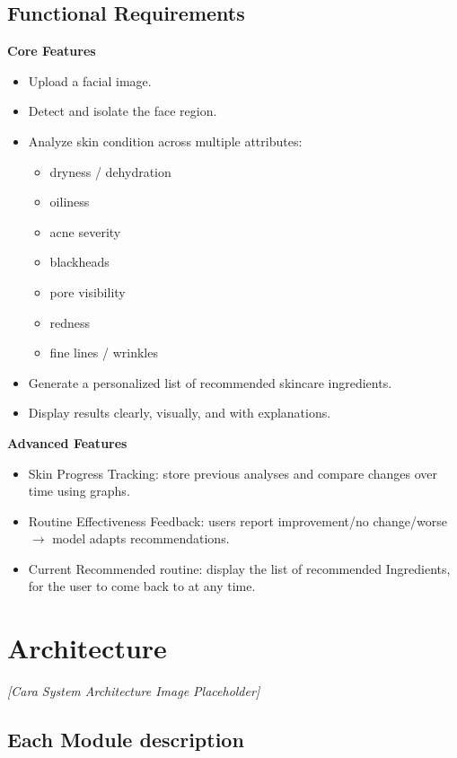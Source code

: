 \documentclass[12pt,a4paper]{article}
\begin{document}
\subsection{Functional Requirements}
\textbf{Core Features}
\begin{itemize}
    \item Upload a facial image.
    \item Detect and isolate the face region.
    \item Analyze skin condition across multiple attributes:
    \begin{itemize}
        \item dryness / dehydration
        \item oiliness
        \item acne severity
        \item blackheads
        \item pore visibility
        \item redness
        \item fine lines / wrinkles
    \end{itemize}
    \item Generate a personalized list of recommended skincare ingredients.
    \item Display results clearly, visually, and with explanations.
\end{itemize}

\textbf{Advanced Features}
\begin{itemize}
    \item Skin Progress Tracking: store previous analyses and compare changes over time using graphs.
    \item Routine Effectiveness Feedback: users report improvement/no change/worse $\rightarrow$ model adapts recommendations.
    \item Current Recommended routine: display the list of recommended Ingredients, for the user to come back to at any time.
\end{itemize}

\section{Architecture}
\textit{[Cara System Architecture Image Placeholder]}

\subsection{Each Module description}
\end{document}
